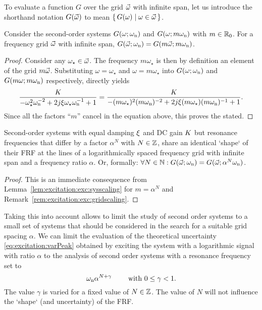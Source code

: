   \begin{definition}
  To evaluate a function $G$ over the grid $\vec{\omega}$ with infinite span, let us introduce the shorthand notation $G(\vec{\omega})$ to mean $\set{G(\omega) | \omega \in \ensuremath{\vec{\omega}}}$.
  \end{definition}

  \begin{lemma} \label{lem:excitation:exc:sysscaling}
  Consider the second-order systems $G(\omega; \omega_{\mathrm{n}})$ and $G(\omega; m\omega_{\mathrm{n}})$ with $m \in {\ensuremath{\mathbb{R}}}_{0}$. 
  For a frequency grid $\vec{\omega}$ with infinite span, $G(\vec{\omega}; \omega_{\mathrm{n}}) = G(m \vec{\omega}; m\omega_{\mathrm{n}})$.
  \end{lemma}
  \begin{proof}
  Consider any $\omega_{\star} \in \vec{\omega}$. The frequency $m\omega_{\star}$ is then by definition an element of the grid $m\vec{\omega}$.
  Substituting $\omega = \omega_{\star}$ and $\omega = m \omega_{\star}$  into  $G(\omega; \omega_{\mathrm{n}})$ and $G(m\omega; m\omega_{\mathrm{n}})$  respectively, directly yields
  \begin{equation}
    \frac{K_{}}{- \omega_{\star}^2 \omega_{\mathrm{n}}^{-2} + 2j\xi_{} \omega_{\star} \omega_{\mathrm{n}}^{-1} + 1} = 
    \frac{K_{}}{- (m\omega_{\star})^2 (m\omega_{\mathrm{n}})^{-2} + 2j\xi_{} (m\omega_{\star}) (m\omega_{\mathrm{n}})^{-1} + 1}
    \text{.}
  \end{equation}
  Since all the factors ``$m$'' cancel in the equation above, this proves the stated.
  \end{proof}

  \begin{theorem}
    Second-order  systems with equal damping $\xi_{}$ and \gls{DC} gain $K_{}$ but resonance frequencies that differ by a factor $\alpha^N$ with $N \in \mathbb{Z}$, share an identical `shape` of their \gls{FRF} at the lines of a logarithmically spaced frequency grid with infinite span and a frequency ratio $\alpha$.
    Or, formally: $\forall N \in \mathbb{N}: G(\vec{\omega};\omega_{\mathrm{n}}) = G(\vec{\omega}; \alpha^{N}\omega_{\mathrm{n}})$.
  \end{theorem}
  \begin{proof}
    This is an immediate consequence from Lemma~\ref{lem:excitation:exc:sysscaling} for $m= \alpha^{N}$ and Remark~\ref{rem:excitation:exc:gridscaling}.
  \end{proof}

  Taking this into account allows to limit the study of second order systems to a small set of systems that should be considered in the search for a suitable grid spacing $\alpha$.
  We can limit the evaluation of the theoretical uncertainty \eqref{eq:excitation:varPeak} obtained by exciting the system with a logarithmic signal with ratio $\alpha$ to the analysis of second order systems with a resonance frequency set to
  \begin{equation}
    \omega_{\mathrm{n}} \alpha^{N+\gamma}\qquad \text{ with } 0 \leq \gamma < 1\text{.}
    \label{eq:excitation:theoreticalBestVariationOmega}
  \end{equation}
  The value $\gamma$ is varied for a fixed value of $N \in \mathbb{Z}$.
  The value of $N$ will not influence the `shape` (and uncertainty) of the FRF.

